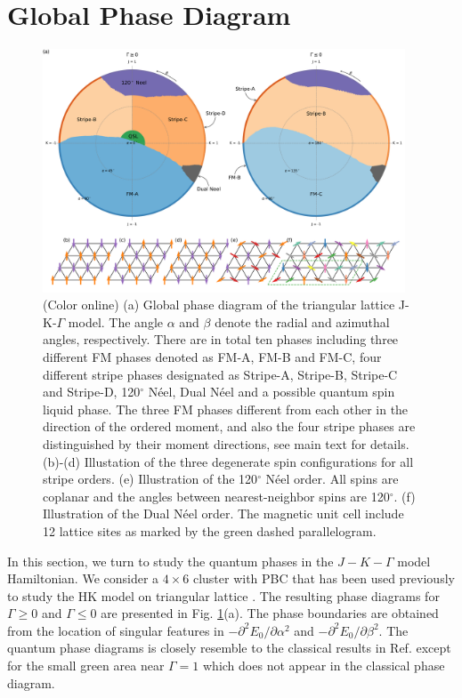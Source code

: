 \documentclass[aps,prb,reprint,groupedaddress,showpacs,amsfonts,amsmath,amssymb,superscriptaddress]{revtex4-1}
\begin{document}
\section{Global Phase Diagram}
\begin{figure}
    \centering
    \includegraphics[width=0.96\textwidth]{Fig2.pdf}
    \caption{(Color online) (a) Global phase diagram of the triangular lattice J-K-$\Gamma$ model. The angle $\alpha$ and $\beta$ denote the radial and azimuthal angles, respectively. There are in total ten phases including three different FM phases denoted as FM-A, FM-B and FM-C, four different stripe phases designated as Stripe-A, Stripe-B, Stripe-C and Stripe-D, 120$^\circ$ N\'{e}el, Dual N\'{e}el and a possible quantum spin liquid phase. The three FM phases different from each other in the direction of the ordered moment, and also the four stripe phases are distinguished by their moment directions, see main text for details. (b)-(d) Illustation of the three degenerate spin configurations for all stripe orders. (e) Illustration of the 120$^\circ$ N\'{e}el order. All spins are coplanar and the angles between nearest-neighbor spins are 120$^\circ$. (f) Illustration of the Dual N\'{e}el order. The magnetic unit cell include 12 lattice sites as marked by the green dashed parallelogram.}
     \label{fig:PhaseDiagram}
\end{figure}

In this section, we turn to study the quantum phases in the $J-K-\Gamma$ model Hamiltonian. We consider a $4 \times 6$ cluster with PBC that has been used previously to study the HK model on triangular lattice \cite{KaiLi2015}. The resulting phase diagrams for $\Gamma \geq 0$ and $\Gamma \leq 0$ are presented in Fig. \ref{fig:PhaseDiagram}(a). The phase boundaries are obtained from the location of singular features in $-\partial^2E_0/\partial\alpha^2$ and $-\partial^2E_0/\partial\beta^2$. The quantum phase diagrams is closely resemble to the classical results in Ref.  except for the small green area near $\Gamma=1$ which does not appear in the classical phase diagram.
\end{document}
